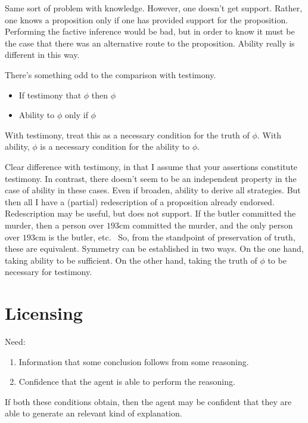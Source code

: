 \documentclass[10pt]{article}
\begin{document}
\begin{note}
  Same sort of problem with knowledge.
  However, one doesn't get support.
  Rather, one knows a proposition only if one has provided support for the proposition.
  Performing the factive inference would be bad, but in order to know it must be the case that there was an alternative route to the proposition.
  Ability really is different in this way.
\end{note}


\begin{note}
  There's something odd to the comparison with testimony.
  \begin{itemize}
  \item If testimony that \(\phi\) then \(\phi\)
  \item Ability to \(\phi\) only if \(\phi\)
  \end{itemize}
  With testimony, treat this as a necessary condition for the truth of \(\phi\).
  With ability, \(\phi\) is a necessary condition for the ability to \(\phi\).

  {
    \color{green}
    Clear difference with testimony, in that I assume that your assertions constitute testimony.
    In contrast, there doesn't seem to be an independent property in the case of ability in these cases.
    Even if broaden, ability to derive all strategies.
    But then all I have a (partial) redescription of a proposition already endorsed.
    Redescription may be useful, but does not support.
    If the butler committed the murder, then a person over \(193\)cm committed the murder, and the only person over \(193\)cm is the butler, etc.\
  }
  So, from the standpoint of preservation of truth, these are equivalent.
  Symmetry can be established in two ways.
  On the one hand, taking ability to be sufficient.
  On the other hand, taking the truth of \(\phi\) to be necessary for testimony.
\end{note}

\newpage

\section{Licensing}
\label{sec:licensing}

\begin{note}
  Need:
  \begin{enumerate}
  \item Information that some conclusion follows from some reasoning.
  \item Confidence that the agent is able to perform the reasoning.
  \end{enumerate}
  If both these conditions obtain, then the agent may be confident that they are able to generate an {\color{red} relevant kind of} explanation.
\end{note}
\end{document}
